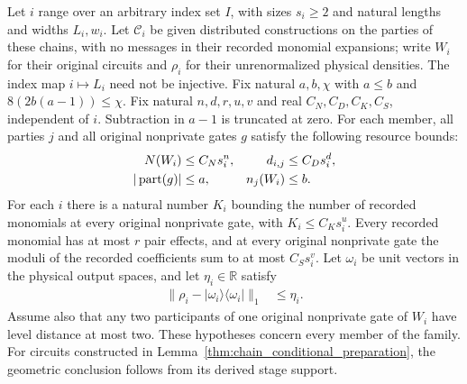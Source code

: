 \begin{lemma}
    \label{thm:chain_uniform_compressed_block_column}
    \leanok
    Let $i$ range over an arbitrary index set $I$, with sizes $s_i\ge2$
    and natural lengths and widths $L_i,w_i$. Let $\mathcal C_i$ be given
    distributed constructions on the parties of these chains,
    with no messages in their recorded monomial expansions;
    write $W_i$ for their original circuits and $\rho_i$ for their
    unrenormalized physical densities. The index map $i\mapsto L_i$
    need not be injective.
    Fix natural $a,b,\chi$ with $a\le b$ and
    $8(2b(a-1))\le\chi$. Fix natural $n,d,r,u,v$ and real
    $C_N,C_D,C_K,C_S$, independent of $i$.
    Subtraction in $a-1$ is truncated at zero.
    For each member, all parties $j$ and all original nonprivate gates $g$
    satisfy the following resource bounds:
    \begin{align}
        N(W_i)                   & \le C_Ns_i^n, & d_{i,j}  & \le C_Ds_i^d,\notag \\
        |\operatorname{part}(g)| & \le a,        & n_j(W_i) & \le b.\notag
    \end{align}
    For each $i$ there is a natural number $K_i$ bounding the number of
    recorded monomials at every original nonprivate gate, with
    $K_i\le C_Ks_i^u$. Every recorded monomial has at most $r$ pair
    effects, and at every original nonprivate gate the moduli of the
    recorded coefficients sum to at most $C_Ss_i^v$.
    Let $\omega_i$ be unit vectors in the physical output spaces,
    and let $\eta_i\in\mathbb R$ satisfy
    \begin{align}
        \|\rho_i-|\omega_i\rangle\langle\omega_i|\|_1 & \le\eta_i.
        \label{eq:chain_uniform_pure_input}
    \end{align}
    Assume also that any two participants of one original nonprivate
    gate of $W_i$ have level distance at most two. These hypotheses
    concern every member of the family. For circuits constructed in
    Lemma~\ref{thm:chain_conditional_preparation}, the geometric
    conclusion follows from its derived stage support.


\end{lemma}
